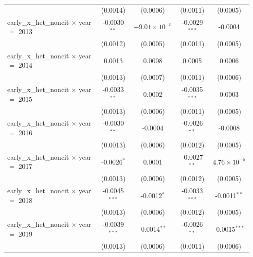 \begin{tabular}{lcccc}
                                                    & (0.0014)           & (0.0006)                  & (0.0011)             & (0.0005)\\   
   early\_x\_het\_noncit $\times$ year $=$ 2013     & -0.0030$^{**}$     & $-9.01\times 10^{-5}$     & -0.0029$^{***}$      & -0.0004\\   
                                                    & (0.0012)           & (0.0005)                  & (0.0011)             & (0.0005)\\   
   early\_x\_het\_noncit $\times$ year $=$ 2014     & 0.0013             & 0.0008                    & 0.0005               & 0.0006\\   
                                                    & (0.0013)           & (0.0007)                  & (0.0011)             & (0.0006)\\   
   early\_x\_het\_noncit $\times$ year $=$ 2015     & -0.0033$^{**}$     & 0.0002                    & -0.0035$^{***}$      & 0.0003\\   
                                                    & (0.0013)           & (0.0006)                  & (0.0011)             & (0.0005)\\   
   early\_x\_het\_noncit $\times$ year $=$ 2016     & -0.0030$^{**}$     & -0.0004                   & -0.0026$^{**}$       & -0.0008\\   
                                                    & (0.0013)           & (0.0006)                  & (0.0012)             & (0.0005)\\   
   early\_x\_het\_noncit $\times$ year $=$ 2017     & -0.0026$^{*}$      & 0.0001                    & -0.0027$^{**}$       & $4.76\times 10^{-5}$\\    
                                                    & (0.0013)           & (0.0006)                  & (0.0012)             & (0.0005)\\   
   early\_x\_het\_noncit $\times$ year $=$ 2018     & -0.0045$^{***}$    & -0.0012$^{*}$             & -0.0033$^{***}$      & -0.0011$^{**}$\\   
                                                    & (0.0013)           & (0.0006)                  & (0.0012)             & (0.0005)\\   
   early\_x\_het\_noncit $\times$ year $=$ 2019     & -0.0039$^{***}$    & -0.0014$^{**}$            & -0.0026$^{**}$       & -0.0015$^{***}$\\   
                                                    & (0.0013)           & (0.0006)                  & (0.0011)             & (0.0006)\\   

\end{tabular}

